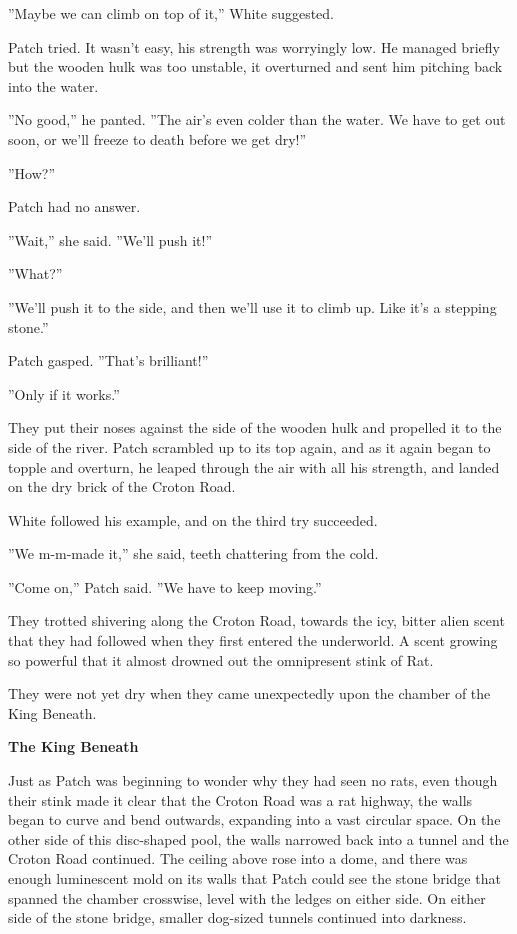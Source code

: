 \documentclass[11pt]{article}
\begin{document}
 ''Maybe we can climb on top of it,'' White suggested.\par
 Patch tried. It wasn't easy, his strength was worryingly low. He managed briefly %
 but the wooden hulk was too unstable, it overturned and sent him pitching back into the water.\par
 ''No good,'' he panted. ''The air's even colder than the water. We have to get out soon, or we'll freeze to death before we get dry!''\par
 ''How?''\par
 Patch had no answer.\par
 ''Wait,'' she said. ''We'll push it!''\par
 ''What?''\par
 ''We'll push it to the side, and then we'll use it to climb up. Like it's a stepping stone.''\par
 Patch gasped. ''That's brilliant!''\par
 ''Only if it works.''\par
 They put their noses against the side of the wooden hulk and propelled it to the side of the river. Patch scrambled up to its top again, and as it again began to topple and overturn, he leaped through the air with all his strength, and landed on the dry brick of the Croton Road.\par
White followed his example, and on the third try succeeded.\par
 ''We m-m-made it,'' she said, teeth chattering from the cold.\par
 ''Come on,'' Patch said. ''We have to keep moving.''\par
 They trotted shivering along the Croton Road, towards the icy, bitter alien scent that they had followed when they first entered the underworld. A scent growing so powerful that it almost drowned out the omnipresent stink of Rat.\par
 They were not yet dry when they came unexpectedly upon the chamber of the King Beneath.\par
\par
\par
{\bf The King Beneath\par
}\par
 Just as Patch was beginning to wonder why they had seen no rats, even though their stink made it clear that the Croton Road was a rat highway, the walls began to curve and bend outwards, expanding into a vast circular space. On the other side of this disc-shaped pool, the walls narrowed back into a tunnel and the Croton Road continued. The ceiling above rose into a dome, and there was enough luminescent mold on its walls that Patch could see the stone bridge that spanned the chamber crosswise, level with the ledges on either side. On either side of the stone bridge, smaller dog-sized tunnels continued into darkness.\par
\end{document}

